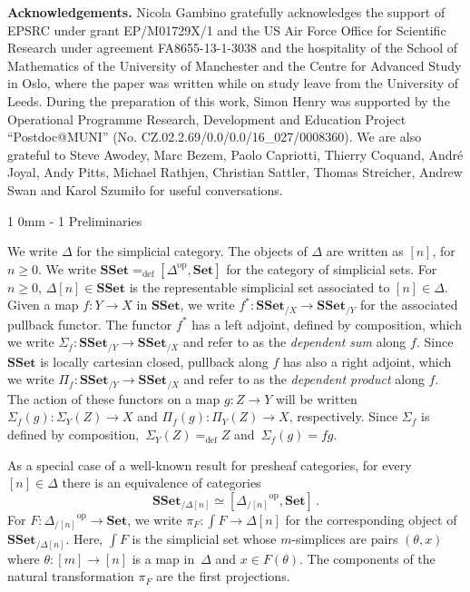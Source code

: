 \documentclass[reqno,10pt,a4paper,oneside,draft]{amsart}
\makeatletter
\renewcommand{\section}{\@startsection
{section}%
{1}%
{0mm}%
{-\baselineskip}%
{1\baselineskip}%
{\Large \bfseries}}%
\numberwithin{equation}{section}
\theoremstyle{mythm}
\theoremstyle{mydef}
\theoremstyle{myrmk}
\newcommand{\defeq}{=_{\operatorname{def}}}
\newcommand{\co}{\colon}
\newcommand{\op}{\operatorname{op}}
\newcommand{\SSet}{\mathbf{SSet}}
\newcommand{\Set}{\mathbf{Set}}
\makeatother
\begin{document}
\smallskip

\noindent 
\textbf{Acknowledgements.} Nicola Gambino gratefully acknowledges the support of
EPSRC under grant EP/M01729X/1 and the US Air Force Office for Scientific Research under 
agreement FA8655-13-1-3038 and the hospitality of the 
School of Mathematics of the University of Manchester and the Centre for Advanced Study in Oslo,
where the paper was written while on study leave from the University of Leeds. During the preparation of this work, Simon Henry was supported by the Operational Programme Research, Development and Education Project ``Postdoc@MUNI'' (No. CZ.02.2.69/0.0/0.0/16\_027/0008360). We are also grateful to Steve Awodey, Marc Bezem, Paolo Capriotti, Thierry Coquand, Andr\'e Joyal, Andy Pitts, Michael Rathjen, Christian Sattler, Thomas Streicher, Andrew Swan and Karol Szumi{\l}o  for useful conversations. 






\section{Preliminaries} 
\label{sec:preliminaries}




We write $\Delta$ for the simplicial category. The objects of $\Delta$ are written as $[n]$, for $n \geq 0$.
We write $\SSet \defeq [\Delta^{\op}, \Set]$ for the category of simplicial sets. For $n \geq 0$, $\Delta[n] \in \SSet$ is the representable simplicial set associated to $[n] \in \Delta$. Given a map $f \co Y \to X$ in $\SSet$, we write $f^* \co \SSet_{/X} \to \SSet_{/Y}$
for the associated pullback functor. The functor $f^*$ has a left adjoint, defined
by composition, which we write $\Sigma_{f} \co \SSet_{/Y} \to \SSet_{/X}$ and refer
to as the \emph{dependent sum} along $f$. Since $\SSet$ is locally cartesian closed, pullback
along $f$ has also a right adjoint, which we write 
$\Pi_f \co \SSet_{/Y} \to \SSet_{/X}$ and refer to as the \emph{dependent
product}  along $f$. The action of these functors on a
map $g \co Z \to Y$ will be written $\Sigma_f(g) \co \Sigma_Y(Z) \to X$ and 
$\Pi_f(g) \co \Pi_Y(Z) \to X$, respectively. Since  $\Sigma_f$ is defined by composition,~$\Sigma_Y(Z) \defeq Z$ and~$\Sigma_f(g) = fg $. 

As a special case of a well-known result for presheaf 
categories,  for every~$[n] \in \Delta$ there is an equivalence of categories
\begin{equation}
\label{equ:psh-slice-sset}
\SSet_{/\Delta[n]} \simeq  [ {\Delta_{/[n]}}^{\op}, \Set]   \, .
\end{equation}
For $F \co {\Delta_{/[n]}}^{\op} \to \Set$, we write $\pi_F \co \int F \to \Delta[n]$
for the corresponding object of~$\SSet_{/ \Delta[n]}$. Here, $\int F$ is the
simplicial set whose $m$-simplices are pairs $(\theta, x)$ where $\theta \co [m] \to [n]$
is a map in~$\Delta$ and $x \in F(\theta)$. The components of the natural
transformation $\pi_F$ are the first projections.
\end{document}
